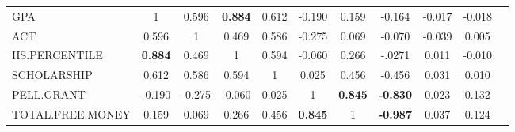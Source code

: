 \documentclass[12pt,english]{report}
\begin{document}
\begin{table}
{\begin{tabular}{@{\extracolsep{4pt}} lcccccccccc}
GPA                & 1              & 0.596  & \textbf{0.884}                                           & 0.612                                                   & -0.190                                                & 0.159                                                       & -0.164                                                   & -0.017                                                  & -0.018                                                        \\
ACT                & 0.596          & 1      & 0.469                                                    & 0.586                                                   & -0.275                                                & 0.069                                                       & -0.070                                                   & -0.039                                                  & 0.005                                                         \\
HS.PERCENTILE      & \textbf{0.884} & 0.469  & 1                                                        & 0.594                                                   & -0.060                                                & 0.266                                                       & -.0271                                                   & 0.011                                                   & -0.010                                                        \\
SCHOLARSHIP        & 0.612          & 0.586  & 0.594                                                    & 1                                                       & 0.025                                                 & 0.456                                                       & -0.456                                                   & 0.031                                                   & 0.010                                                         \\
PELL.GRANT         & -0.190         & -0.275 & -0.060                                                   & 0.025                                                   & 1                                                     & \textbf{0.845}                                              & \textbf{-0.830}                                          & 0.023                                                   & 0.132                                                         \\
TOTAL.FREE.MONEY   & 0.159          & 0.069  & 0.266                                                    & 0.456                                                   & \textbf{0.845}                                        & 1                                                           & \textbf{-0.987}                                          & 0.037                                                   & 0.124                                                         \\

\end{tabular}}
\end{table}
\end{document}
